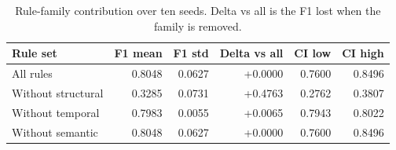 \begin{table}[t]
\centering
\caption{Rule-family contribution over ten seeds. Delta vs all is the F1 lost when the family is removed.}
\label{tab:families}
{\small
\begin{tabular}{lrrrrr}
\toprule
Rule set & F1 mean & F1 std & Delta vs all & CI low & CI high \\
\midrule
All rules & 0.8048 & 0.0627 & +0.0000 & 0.7600 & 0.8496 \\
Without structural & 0.3285 & 0.0731 & +0.4763 & 0.2762 & 0.3807 \\
Without temporal & 0.7983 & 0.0055 & +0.0065 & 0.7943 & 0.8022 \\
Without semantic & 0.8048 & 0.0627 & +0.0000 & 0.7600 & 0.8496 \\
\bottomrule
\end{tabular}
}
\end{table}
